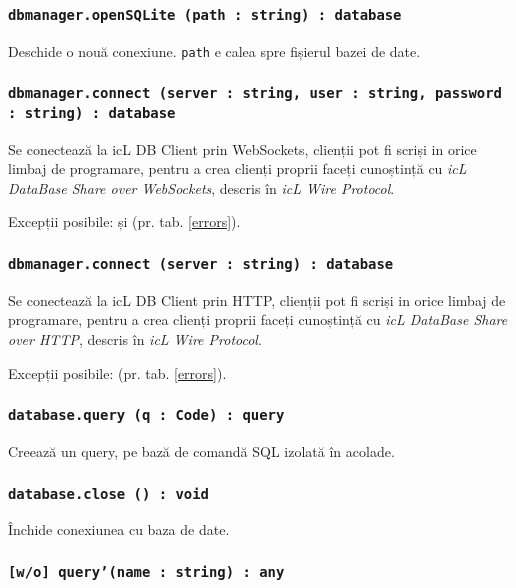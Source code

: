 \subsubsection{\texttt{dbmanager.openSQLite (path : string) : database}}

Deschide o nouă conexiune. \texttt{path} e calea spre fișierul bazei de date.

\subsubsection{\texttt{dbmanager.connect (server : string, user : string, password : string) : database}}

Se conectează la icL DB Client prin WebSockets, clienții pot fi scriși in orice limbaj de programare, pentru a crea clienți proprii faceți cunoștință cu \textit{icL DataBase Share over WebSockets}, descris în \textit{icL Wire Protocol}.

Excepții posibile:  și  (pr. tab. \ref{errors}).

\subsubsection{\texttt{dbmanager.connect (server : string) : database}}

Se conectează la icL DB Client prin HTTP, clienții pot fi scriși in orice limbaj de programare, pentru a crea clienți proprii faceți cunoștință cu \textit{icL DataBase Share over HTTP}, descris în \textit{icL Wire Protocol}.

Excepții posibile:  (pr. tab. \ref{errors}).

\subsubsection{\texttt{database.query (q : Code) : query}}

Creează un query, pe bază de comandă SQL izolată în acolade.

\subsubsection{\texttt{database.close () : void}}

Închide conexiunea cu baza de date.

\subsubsection{\texttt{[w/o] query'(name : string) : any}}

